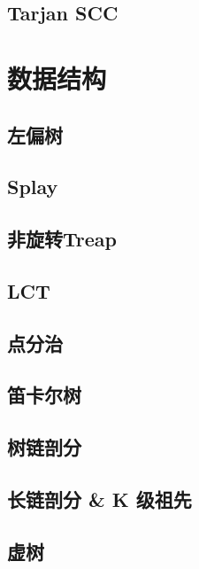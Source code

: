 \documentclass[a4paper,12pt]{article}
\begin{document}
\subsection{Tarjan SCC}


\section{数据结构}

\subsection{左偏树}

\subsection{Splay}

\subsection{非旋转Treap}

\subsection{LCT}

\subsection{点分治}

\subsection{笛卡尔树}

\subsection{树链剖分}

\subsection{长链剖分 \& K 级祖先}

\subsection{虚树}

\end{document}
